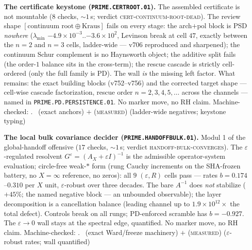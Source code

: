 \documentclass[11pt,a4paper]{article}
\theoremstyle{definition}
\begin{document}
\par\smallskip\noindent\textbf{The certificate keystone
(\texttt{PRIME.CERTROOT.01}).}
The assembled certificate is not mountable ($8$ checks,
${\sim}1$\,s; verdict \textsc{cert-continuum-root-dead}).  The
review shape $[\text{continuum root}\oplus\text{Kraus}]$ fails on
every stage: the arch$+$pol block is PSD \emph{nowhere}
($\lambda_{\min}$ $-4.9\times10^{-3}$..$-3.6\times10^{2}$,
Levinson break at cell $47$, exactly between the $n=2$ and $n=3$
cells, ladder-wide --- v706 reproduced and sharpened); the
continuum Schur complement is no Haynsworth object; the additive
split fails (the order-$1$ balance sits in the cross-term); the
rescue cascade is strictly cell-ordered (only the full family is
PD).  The wall \emph{is} the missing left factor.  What remains:
the exact building blocks (v752--v756) and the corrected target
shape --- cell-wise cascade factorization, rescue order
$n=2,3,4,5,\dots$ across the channels --- named in
\texttt{PRIME.PD.PERSISTENCE.01}.  No marker move, no RH claim.
Machine-checked: .
\mE\ (exact anchors) $+$ (\textsc{measured}) (ladder-wide
negatives; keystone typing)
\par\smallskip

\par\smallskip\noindent\textbf{The local bulk covariance decider
(\texttt{PRIME.HANDOFFBULK.01}).}
Modul 1 of the global-handoff offensive ($17$ checks, ${\sim}1$\,s;
verdict \textsc{handoff-bulk-converges}).  The
$\varepsilon$-regulated resolvent
$G^\varepsilon=(A_X+\varepsilon I)^{-1}$ is the admissible
operator-system evaluation; circle-free weak-$*$ form (rung Cauchy
increments on the SHA-frozen battery, no $X{=}\infty$ reference, no
zeros): all $9$ $(\varepsilon,R)$ cells pass --- rates
$b=0.174$--$0.310$ per $X$ unit, $\varepsilon$-robust over three
decades.  The bare $A^{-1}$ does \emph{not} stabilize ($+45\%$; the
named negative block --- an unbounded observable); the layer
decomposition is a cancellation balance (leading channel up to
$1.9\times10^{12}\times$ the total defect).  Controls break on all
rungs; PD-enforced scramble has $b=-0.927$.  The
$\varepsilon\to0$ wall stays at the spectral edge, quantified.  No
marker move, no RH claim.
Machine-checked: .
\mE\ (exact Ward/freeze machinery) $+$ (\textsc{measured})
($\varepsilon$-robust rates; wall quantified)
\par\smallskip
\end{document}
